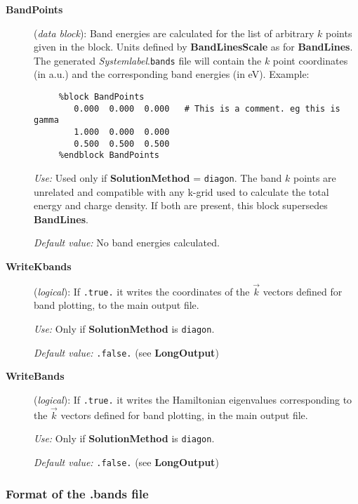 \begin{description}
\item[\textbf{BandPoints}] (\textit{data block}):
Band energies are calculated for the list of arbitrary $k$ points
given in the block. Units defined by \textbf{BandLinesScale} as
for \textbf{BandLines}. The generated \textit{Systemlabel}.\texttt{bands} file
will contain the $k$ point coordinates (in a.u.) and the corresponding
band energies (in eV). Example:

\begin{verbatim}
     %block BandPoints
        0.000  0.000  0.000   # This is a comment. eg this is gamma
        1.000  0.000  0.000
        0.500  0.500  0.500
     %endblock BandPoints
\end{verbatim}

\textit{Use:} Used only if \textbf{SolutionMethod} = \texttt{diagon}.
The band $k$ points are unrelated and compatible with any k-grid used
to calculate the total energy and charge density. If both are present, this
block supersedes \textbf{BandLines}.

\textit{Default value:} No band energies calculated.

\item[\textbf{WriteKbands}] (\textit{logical}):
If \texttt{.true.} it writes the coordinates of the $\vec k$ vectors
defined for band plotting, to the main output file.

\textit{Use:} Only if \textbf{SolutionMethod} is \texttt{diagon}.

\textit{Default value:} \texttt{.false.} (see \textbf{LongOutput})


\item[\textbf{WriteBands}] (\textit{logical}):  If \texttt{.true.} it
  writes the Hamiltonian eigenvalues corresponding to the $\vec k$
  vectors defined for band plotting, in the main output file.

\textit{Use:} Only if \textbf{SolutionMethod} is \texttt{diagon}.

\textit{Default value:} \texttt{.false.} (see \textbf{LongOutput})


\end{description}


\subsubsection{Format of the .bands file}


